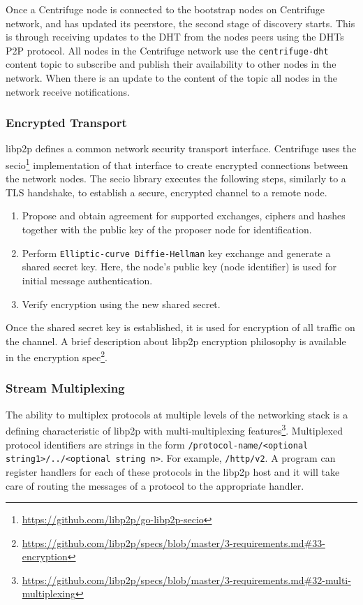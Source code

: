 Once a Centrifuge node is connected to the bootstrap nodes on Centrifuge network, and has updated its peerstore, the second stage of discovery starts. This is through receiving updates to the DHT from the nodes peers using the DHTs P2P protocol. All nodes in the Centrifuge network use the \texttt{centrifuge-dht} content topic to subscribe and publish their availability to other nodes in the network. When there is an update to the content of the topic all nodes in the network receive notifications.

\subsubsection{Encrypted Transport} \label{encrypted transport}
libp2p defines a common network security transport interface. Centrifuge uses the secio\footnote{\url{https://github.com/libp2p/go-libp2p-secio}} implementation of that interface to create encrypted connections between the network nodes. The secio library executes the following steps, similarly to a TLS handshake, to establish a secure, encrypted channel to a remote node. 
\begin{enumerate}
  \item Propose and obtain agreement for supported exchanges, ciphers and hashes together with the public key of the proposer node for identification.
  \item Perform \texttt{Elliptic-curve Diffie-Hellman} key exchange and generate a shared secret key. Here, the node's public key (node identifier) is used for initial message authentication.
  \item Verify encryption using the new shared secret.
\end{enumerate}

Once the shared secret key is established, it is used for encryption of all traffic on the channel. A brief description about libp2p encryption philosophy is available in the encryption spec\footnote{\url{https://github.com/libp2p/specs/blob/master/3-requirements.md\#33-encryption}}.

\subsubsection{Stream Multiplexing}
The ability to multiplex protocols at multiple levels of the networking stack is a defining characteristic of libp2p with multi-multiplexing features\footnote{\url{https://github.com/libp2p/specs/blob/master/3-requirements.md\#32-multi-multiplexing}}. Multiplexed protocol identifiers are strings in the form \texttt{/protocol-name/<optional string1>/../<optional string n>}. For example, \texttt{/http/v2}. A program can register handlers for each of these protocols in the libp2p host and it will take care of routing the messages of a protocol to the appropriate handler. 

